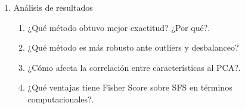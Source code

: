 \begin{enumerate}
\begin{enumerate}
              \item \textbf{PCA}
                    \begin{itemize}
                        \item Remover pares de características altamente correlacionadas (coeficiente $>$ 0.9).
                        \item Determinar componentes para 95\% varianza.
                        \item Visualizar proyección 2D.
                    \end{itemize}
          \end{enumerate}

    \item{Análisis de resultados}
          \begin{enumerate}
              \item ¿Qué método obtuvo mejor exactitud? ¿Por qué?.

              \item ¿Qué método es más robusto ante outliers y desbalanceo?

              \item ¿Cómo afecta la correlación entre características al PCA?.

              \item ¿Qué ventajas tiene Fisher Score sobre SFS en términos computacionales?.
          \end{enumerate}
\end{enumerate}


